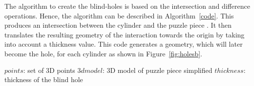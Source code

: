 \documentclass[acmlarge,screen,dvipsnames]{acmart}
\begin{document}
The algorithm to create the blind-holes is based on the intersection
and difference operations. Hence, the algorithm can be described in
Algorithm~\ref{code}. This produces an intersection between the cylinder and  the puzzle piece . It then
translates the resulting geometry of the interaction towards the
origin by taking into account a thickness value. This code generates a
geometry, which will later become the hole, for each cylinder as shown
in Figure~\ref{fig:holesb}.
%
\begin{algorithm}
   $points$: set of 3D points\;
   $3dmodel$: 3D model of puzzle piece simplified\;
   $thickness$: thickness of the blind hole\;
  \caption{\label{code}%
    Algorithm pseudo-code to generate geometries for blind-holes in puzzle pieces}
\end{algorithm}
\end{document}
